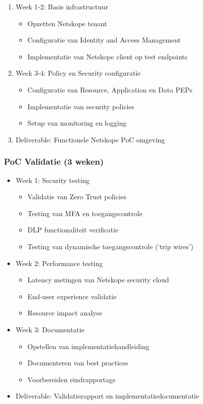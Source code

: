 \begin{enumerate}
  \item Week 1-2: Basis infrastructuur
  \begin{itemize}
    \item Opzetten Netskope tenant
    \item Configuratie van Identity and Access Management
    \item Implementatie van Netskope client op test endpoints
  \end{itemize}

  \item Week 3-4: Policy en Security configuratie
  \begin{itemize}
    \item Configuratie van Resource, Application en Data PEPs
    \item Implementatie van security policies
    \item Setup van monitoring en logging
  \end{itemize}
  \item Deliverable: Functionele Netskope PoC omgeving
\end{enumerate}

\subsubsection{PoC Validatie (3 weken)}
\begin{itemize}
  \item Week 1: Security testing
  \begin{itemize}
    \item Validatie van Zero Trust policies
    \item Testing van MFA en toegangscontrole
    \item DLP functionaliteit verificatie
    \item Testing van dynamische toegangscontrole (‘trip wires’)
  \end{itemize}
  
  \item Week 2: Performance testing
  \begin{itemize}
    \item Latency metingen van Netskope security cloud
    \item End-user experience validatie
    \item Resource impact analyse
  \end{itemize}
  
  \item Week 3: Documentatie
  \begin{itemize}
    \item Opstellen van implementatiehandleiding
    \item Documenteren van best practices
    \item Voorbereiden eindrapportage
  \end{itemize}
  \item Deliverable: Validatierapport en implementatiedocumentatie
\end{itemize}

